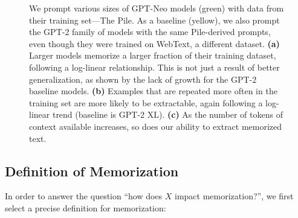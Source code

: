 \begin{figure}
\begin{subfigure}[b]{0.27\textwidth}
        \caption{}
        \label{fig:main-res-context}
    \end{subfigure}
    \vskip-5pt
    \caption{
    We prompt various sizes of GPT-Neo models (green) with data from their training set---The Pile. 
    As a baseline (yellow), we also prompt the GPT-2 family of models with the same Pile-derived prompts, even though they were trained on WebText, a different dataset.
    \textbf{(a)}
    Larger models memorize a larger fraction of their training dataset, following a log-linear relationship.
    This is not just a result of better generalization, as shown by the lack of growth for the GPT-2 baseline models.
    \textbf{(b)}
    Examples that are repeated more often in the training set are more likely to be extractable,
    again following a log-linear trend (baseline is GPT-2 XL). 
    \textbf{(c)}
    As the number of tokens of context available increases, so does our ability to extract memorized text.
    }
    \label{fig:main-res}
\end{figure}

\subsection{Definition of Memorization}
\label{sec:mem-def}
In order to answer the question
``how does $X$ impact memorization?'',
we first select a precise definition for memorization:

